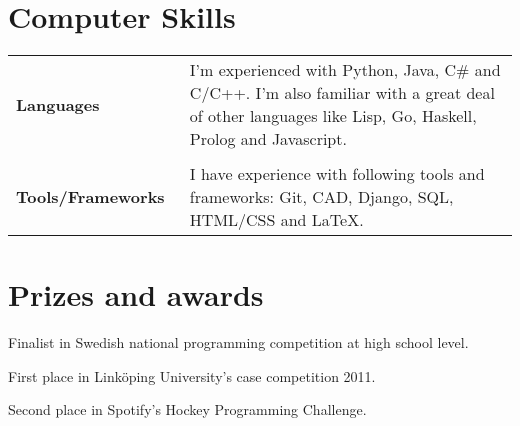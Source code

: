 \documentclass[a4paper,10pt]{article} %
\begin{document}
\section{Computer Skills}
\begin{tabular}{lp{13cm}}
\textbf{Languages} & \small{I'm experienced with Python, Java, C\# and C/C++. I'm also familiar with a great deal of other languages like Lisp, Go, Haskell, Prolog and Javascript.}\\\\
\textbf{Tools/Frameworks~} & \small{I have experience with following tools and frameworks: Git, CAD, Django, SQL, HTML/CSS and LaTeX.}


\end{tabular}




\section{Prizes and awards}
\begin{itemize}[noitemsep,topsep=0pt,parsep=0pt,partopsep=0pt]
\small{
\item Finalist in Swedish national programming competition at high school level.
\item First place in Linköping University’s case competition 2011.
\item Second place in Spotify’s Hockey Programming Challenge.
}
\end{itemize}
\end{document}
